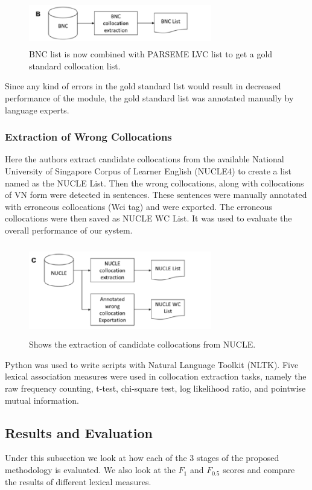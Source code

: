 \documentclass[11pt,a4paper]{article}
\begin{document}
\begin{figure}[H]
  \includegraphics[width=8cm, height=2cm]{gfx/c_stage_2.png}
  \caption{BNC list is now combined with PARSEME LVC list to get a gold standard collocation list.}
  \label{fig:c_stage_2}
\end{figure}

Since any kind of errors in the gold standard list would result in decreased performance of the module, the gold standard list was annotated manually by language experts. 

\subsubsection{Extraction of Wrong Collocations}
Here the authors extract candidate collocations from the available National University of Singapore Corpus of Learner English (NUCLE4) to create a list named as the NUCLE List. Then the wrong collocations, along with collocations of VN form were detected in sentences. These sentences were manually annotated with erroneous collocations
(Wci tag) and were exported. The erroneous collocations were then saved as NUCLE WC List. It was used to evaluate the overall performance of our system.

\begin{figure}[H]
  \includegraphics[width=8cm, height=4cm]{gfx/c_stage_3.png}
  \caption{Shows the extraction of candidate collocations from NUCLE.}
  \label{fig:c_stage_3}
\end{figure}

Python was used to write scripts with Natural Language Toolkit (NLTK). Five lexical association measures were used in collocation extraction tasks, namely the raw frequency
counting, t-test, chi-square test, log likelihood ratio, and pointwise mutual information.

\subsection{Results and Evaluation}
Under this subsection we look at how each of the 3 stages of the proposed methodology is evaluated. We also look at the $F_1$ and $F_{0.5}$ scores and compare the results of different lexical measures.
\end{document}
